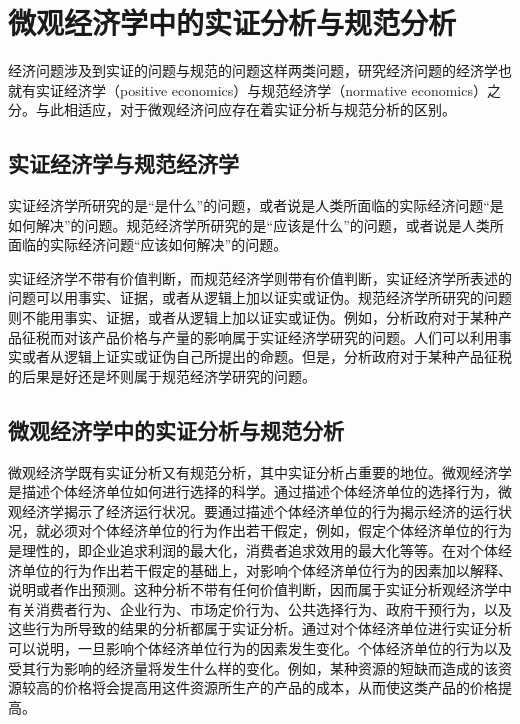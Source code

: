 \section{微观经济学中的实证分析与规范分析}

经济问题涉及到实证的问题与规范的问题这样两类问题，研究经济问题的经济学也就有实证经济学（positive economics）与规范经济学（normative economics）之分。与此相适应，对于微观经济问应存在着实证分析与规范分析的区别。

\subsection{实证经济学与规范经济学}

{\hei 实证经济学}所研究的是“是什么”的问题，或者说是人类所面临的实际经济问题“是如何解决”的问题。{\hei 规范经济学}所研究的是“应该是什么”的问题，或者说是人类所面临的实际经济问题“应该如何解决”的问题。

实证经济学不带有价值判断，而规范经济学则带有价值判断，实证经济学所表述的问题可以用事实、证据，或者从逻辑上加以证实或证伪。规范经济学所研究的问题则不能用事实、证据，或者从逻辑上加以证实或证伪。例如，分析政府对于某种产品征税而对该产品价格与产量的影响属于实证经济学研究的问题。人们可以利用事实或者从逻辑上证实或证伪自己所提出的命题。但是，分析政府对于某种产品征税的后果是好还是坏则属于规范经济学研究的问题。

\subsection{微观经济学中的实证分析与规范分析}

微观经济学既有实证分析又有规范分析，其中实证分析占重要的地位。{\hei 微观经济学}是描述个体经济单位如何进行选择的科学。通过描述个体经济单位的选择行为，微观经济学揭示了经济运行状况。要通过描述个体经济单位的行为揭示经济的运行状况，就必须对个体经济单位的行为作出若干假定，例如，假定个体经济单位的行为是理性的，即企业追求利润的最大化，消费者追求效用的最大化等等。在对个体经济单位的行为作出若干假定的基础上，对影响个体经济单位行为的因素加以解释、说明或者作出预测。这种分析不带有任何价值判断，因而属于实证分析观经济学中有关消费者行为、企业行为、市场定价行为、公共选择行为、政府干预行为，以及这些行为所导致的结果的分析都属于实证分析。通过对个体经济单位进行实证分析可以说明，一旦影响个体经济单位行为的因素发生变化。个体经济单位的行为以及受其行为影响的经济量将发生什么样的变化。例如，某种资源的短缺而造成的该资源较高的价格将会提高用这件资源所生产的产品的成本，从而使这类产品的价格提高。

